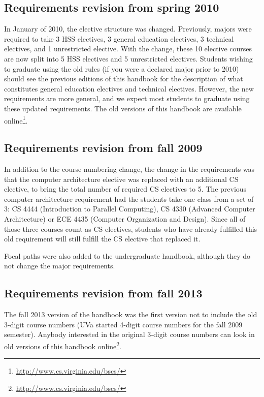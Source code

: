 \documentclass[10pt,letter]{book}
\newcommand{\myurl}[1]{\footnote{\scriptsize\url{#1}}}
\begin{document}
\subsection{Requirements revision from spring 2010}

In January of 2010, the elective structure was changed. Previously,
majors were required to take 3 HSS electives, 3 general education
electives, 3 technical electives, and 1 unrestricted elective. With
the change, these 10 elective courses are now split into 5 HSS
electives and 5 unrestricted electives. Students wishing to graduate
using the old rules (if you were a declared major prior to 2010)
should see the previous editions of this handbook for the description
of what constitutes general education electives and technical
electives. However, the new requirements are more general, and we
expect most students to graduate using these updated requirements. The
old versions of this handbook are available
online\myurl{http://www.cs.virginia.edu/bscs/}.

\subsection{Requirements revision from fall 2009}

In addition to the course numbering change, the change in the
requirements was that the computer architecture elective was replaced
with an additional CS elective, to bring the total number of required
CS electives to 5. The previous computer architecture requirement had
the students take one class from a set of 3: CS 4444
(Introduction to Parallel Computing), CS 4330 (Advanced Computer
Architecture) or ECE 4435 (Computer Organization and
Design). Since all of those three courses count as CS electives,
students who have already fulfilled this old requirement will still
fulfill the CS elective that replaced it.

Focal paths were also added to the undergraduate handbook, although
they do not change the major requirements.

\subsection{Requirements revision from fall 2013}

The fall 2013 version of the handbook was the first version not to
include the old 3-digit course numbers (UVa started 4-digit course
numbers for the fall 2009 semester).  Anybody interested in the
original 3-digit course numbers can look in old versions of this
handbook online\myurl{http://www.cs.virginia.edu/bscs/}.
\end{document}
